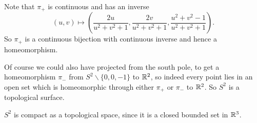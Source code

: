 \documentclass[a4paper]{scrartcl}
\begin{document}
\begin{example}
\begin{center}
    \end{center}

    Note that $\pi_{+}$ is continuous and has an inverse
    $$
    (u, v) \mapsto \left(\frac{2u}{u^2 + v^2 + 1}, \frac{2v}{u^2 + v^2 + 1}, \frac{u^2 + v^2 - 1}{u^2 + v^2 + 1}\right).
    $$
    So $\pi_+$ is a continuous bijection with continuous inverse and hence a homeomorphism.

    Of course we could also have projected from the south pole, to get a homeomorphism $\pi_-$ from $S^2 \backslash \{0, 0, -1\}$ to $\mathbb{R}^2$, so indeed every point lies in an open set which is homeomorphic through either $\pi_+$ or $\pi_-$ to $\mathbb{R}^2$. So $S^2$ is a topological surface.
\end{example}

\begin{remark}
    $S^2$ is compact as a topological space, since it is a closed bounded set in $\mathbb{R}^3$.
\end{remark}
\end{document}
